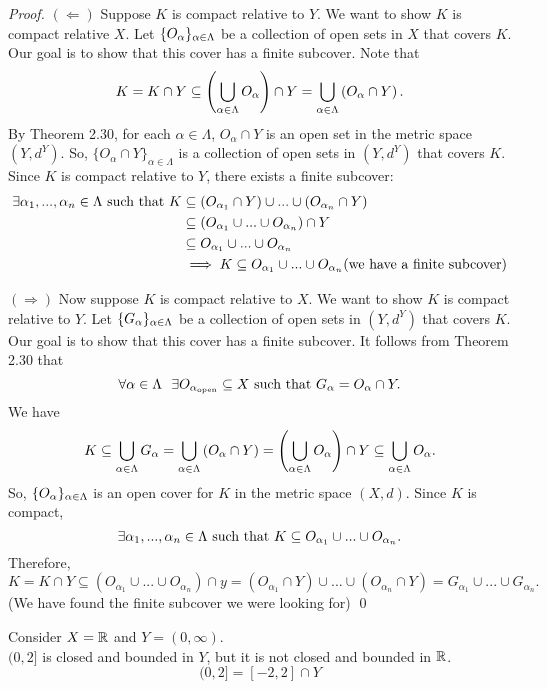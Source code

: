 	\begin{proof}
		$(\Leftarrow)$ Suppose $K$ is compact relative to $Y$. We want to show $K$ is compact relative $X$. Let $\{O_\alpha \}_{\alpha \in \Lambda}$ be a collection of open sets in $X$ that covers $K$. Our goal is to show that this cover has a finite subcover. Note that
		$$K=K\cap Y \subseteq \left( \bigcup \limits_{\alpha \in \Lambda} O _\alpha \right)\cap Y = \bigcup \limits_{\alpha \in \Lambda} \left(O_\alpha \cap Y \right).$$
		By Theorem 2.30, for each $\alpha \in \Lambda$, $O_\alpha \cap Y$ is an open set in the metric space $(Y,d^Y).$ So, $\{O_\alpha \cap Y\}_{\alpha \in \Lambda}$ is a collection of open sets in $(Y,d^Y)$ that covers $K$. Since $K$ is compact relative to $Y$, there exists a finite subcover:
		\begin{align*}
			\exists \alpha_1,...,\alpha_n \in \Lambda \text{ such that } K &\subseteq (O_{\alpha_1}\cap Y)\cup...\cup(O_{\alpha_n}\cap Y) \\
			&\subseteq(O_{\alpha_1}\cup ... \cup O_{\alpha_n})\cap Y \\
			&\subseteq O_{\alpha_1}\cup ... \cup O_{\alpha_n}\\
			&\implies K \subseteq O_{\alpha_1}\cup ... \cup O_{\alpha_n} \text{(we have a finite subcover)}
		\end{align*}
		
		$(\Rightarrow)$ Now suppose $K$ is compact relative to $X$. We want to show $K$ is compact relative to $Y$. Let $\{G_\alpha \}_{\alpha \in \Lambda}$ be a collection of open sets in $(Y, d^Y)$ that covers $K$. Our goal is to show that this cover has a finite subcover. It follows from Theorem 2.30 that
		$$\forall \alpha \in \Lambda ~~ \exists O_{\alpha_{\text{open}}} \subseteq X \text{ such that } G_\alpha = O_\alpha \cap Y.$$
		We have
		$$K \subseteq \bigcup \limits_{\alpha \in \Lambda} G _\alpha = \bigcup \limits_{\alpha \in \Lambda} \left(O_\alpha \cap Y\right) = \left(\bigcup \limits_{\alpha \in \Lambda} O _\alpha\right) \cap Y \subseteq \bigcup \limits_{\alpha \in \Lambda} O _\alpha.$$
		So, $\{O_\alpha \}_{\alpha \in \Lambda}$ is an open cover for $K$ in the metric space $(X,d)$. Since $K$ is compact, $$\exists \alpha_1,...,\alpha_n \in \Lambda \text{ such that } K \subseteq O_{\alpha_1}\cup... \cup O_{\alpha_n}.$$
		Therefore, $$K=K\cap Y \subseteq (O_{\alpha_1}\cup ... \cup O_{\alpha_n})\cap y = (O_{\alpha_1}\cap Y)\cup ... \cup (O_{\alpha_n}\cap Y) = G_{\alpha_1}\cup...\cup G_{\alpha_n}.$$
		(We have found the finite subcover we were looking for) \qed
	\end{proof}
	
	Consider $X=\mathbb{R}$ and $Y=(0,\infty).$ \\
	$(0, 2]$ is closed and bounded in $Y$, but it is not closed and bounded in $\mathbb{R}$.
	$$(0,2]=[-2,2]\cap Y$$
	
